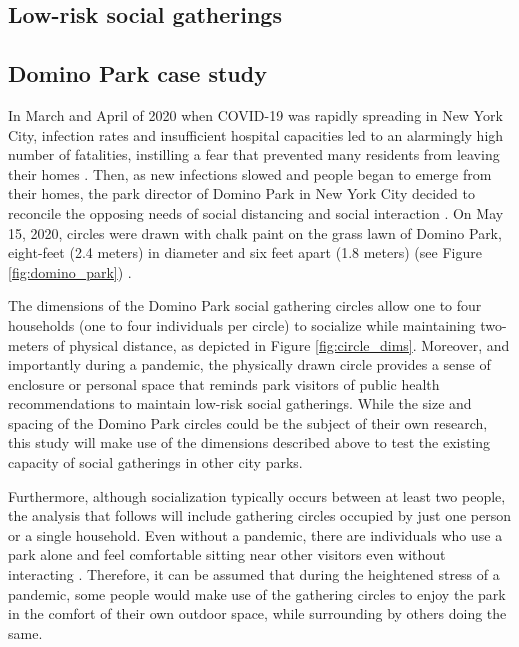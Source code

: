 \begin{multicols}{2}

\section{Low-risk social gatherings}
\subsection{Domino Park case study}
In March and April of 2020 when COVID-19 was rapidly spreading in New York City, infection rates and insufficient hospital capacities led to an alarmingly high number of fatalities, instilling a fear that prevented many residents from leaving their homes \cite{thompson_covid-19_2020}. Then, as new infections slowed and people began to emerge from their homes, the park director of Domino Park in New York City decided to reconcile the opposing needs of social distancing and social interaction \cite{strauss_how_2020}. On May 15, 2020, circles were drawn with chalk paint on the grass lawn of Domino Park, eight-feet (2.4 meters) in diameter and six feet apart (1.8 meters) (see Figure \ref{fig:domino_park}) \cite{cogley_white_2020}. 

The dimensions of the Domino Park social gathering circles allow one to four households (one to four individuals per circle) to socialize while maintaining two-meters of physical distance, as depicted in Figure \ref{fig:circle_dims}. Moreover, and importantly during a pandemic, the physically drawn circle provides a sense of enclosure or personal space that reminds park visitors of public health recommendations to maintain low-risk social gatherings. While the size and spacing of the Domino Park circles could be the subject of their own research, this study will make use of the dimensions described above to test the existing capacity of social gatherings in other city parks. 

Furthermore, although socialization typically occurs between at least two people, the analysis that follows will include gathering circles occupied by just one person or a single household. Even without a pandemic, there are individuals who use a park alone and feel comfortable sitting near other visitors even without interacting \cite{peters_social_2010}. Therefore, it can be assumed that during the heightened stress of a pandemic, some people would make use of the gathering circles to enjoy the park in the comfort of their own outdoor space, while surrounding by others doing the same.
\end{multicols}

